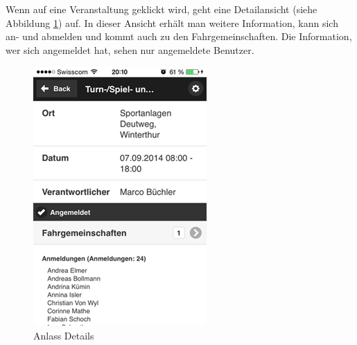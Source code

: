 Wenn auf eine Veranstaltung geklickt wird, geht eine Detailansicht (siehe Abbildung \ref{fig:app_detail_event}) auf. In dieser Ansicht erhält man weitere Information, kann sich an- und abmelden und kommt auch zu den Fahrgemeinschaften. Die Information, wer sich angemeldet hat, sehen nur angemeldete Benutzer.

\begin{figure}[h]
\centering
\includegraphics[scale=0.5]{images/app/event_detail.png}
\caption{Anlass Details}
\label{fig:app_detail_event}
\end{figure}

\newpage
\FloatBarrier
